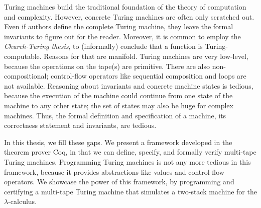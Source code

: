 Turing machines build the traditional foundation of the theory of computation and complexity.  However, concrete Turing machines are often only
scratched out.  Even if authors define the complete Turing machine, they leave the formal invariants to figure out for the reader.  Moreover, it is
common to employ the \textit{Church-Turing thesis}, to (informally) conclude that a function is Turing-computable.  Reasons for that are manifold.
Turing machines are very low-level, because the operations on the tape(s) are primitive.  There are also non-compositional; control-flow operators
like sequential composition and loops are not available.  Reasoning about invariants and concrete machine states is tedious, because the execution of
the machine could continue from one state of the machine to any other state; the set of states may also be huge for complex machines.  Thus, the
formal definition and specification of a machine, its correctness statement and invariants, are tedious.

In this thesis, we fill these gaps.  We present a framework developed in the theorem prover Coq, in that we can define, specify, and formally verify
multi-tape Turing machines.  Programming Turing machines is not any more tedious in this framework, because it provides abstractions like values and
control-flow operators.  We showcase the power of this framework, by programming and certifying a multi-tape Turing machine that simulates a two-stack
machine for the $\lambda$-calculus.


